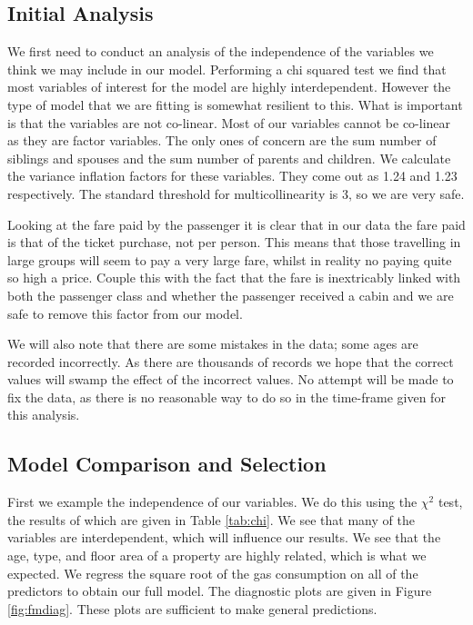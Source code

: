 \documentclass[]{extarticle}
\begin{document}
\subsection{Initial Analysis}

We first need to conduct an analysis of the independence of the variables we think we may include in our model. Performing a chi squared test we find that most variables of interest for the model are highly interdependent. However the type of model that we are fitting is somewhat resilient to this. What is important is that the variables are not co-linear. Most of our variables cannot be co-linear as they are factor variables. The only ones of concern are the sum number of siblings and spouses and the sum number of parents and children. We calculate the variance inflation factors for these variables. They come out as 1.24 and 1.23 respectively. The standard threshold for multicollinearity is 3, so we are very safe.

Looking at the fare paid by the passenger it is clear that in our data the fare paid is that of the ticket purchase, not per person. This means that those travelling in large groups will seem to pay a very large fare, whilst in reality no paying quite so high a price. Couple this with the fact that the fare is inextricably linked with both the passenger class and whether the passenger received a cabin and we are safe to remove this factor from our model. 

We will also note that there are some mistakes in the data; some ages are recorded incorrectly. As there are thousands of records we hope that the correct values will swamp the effect of the incorrect values. No attempt will be made to fix the data, as there is no reasonable way to do so in the time-frame given for this analysis.

\subsection{Model Comparison and Selection}
 First we example the independence of our variables. We do this using the $\chi^2$ test, the results of which are given in Table \ref{tab:chi}. We see that many of the variables are interdependent, which will influence our results. We see that the age, type, and floor area of a property are highly related, which is what we expected. We regress the square root of the gas consumption on all of the predictors to obtain our full model. The diagnostic plots are given in Figure \ref{fig:fmdiag}. These plots are sufficient to make general predictions.
\end{document}

